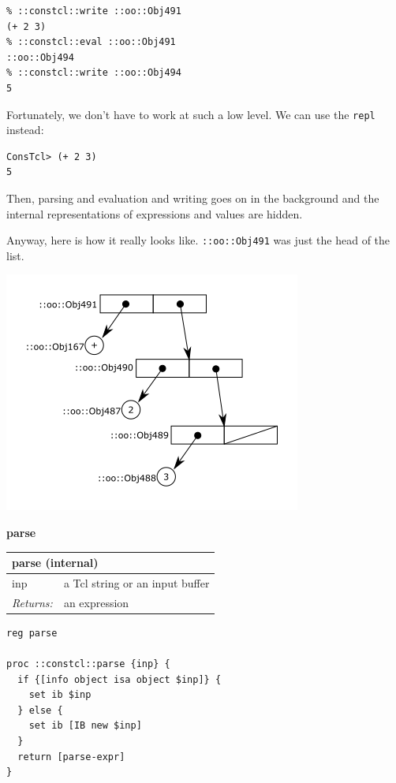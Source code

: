 \documentclass[twoside,9pt]{report}
\begin{document}
\noindent\makebox[\linewidth]{\rule{\linewidth}{0.4pt}}
\begin{lstlisting}
% ::constcl::write ::oo::Obj491
(+ 2 3)
% ::constcl::eval ::oo::Obj491
::oo::Obj494
% ::constcl::write ::oo::Obj494
5
\end{lstlisting}
\noindent\makebox[\linewidth]{\rule{\linewidth}{0.4pt}}

Fortunately, we don't have to work at such a low level. We can use the \texttt{repl} instead:

\noindent\makebox[\linewidth]{\rule{\linewidth}{0.4pt}}
\begin{lstlisting}
ConsTcl> (+ 2 3)
5
\end{lstlisting}
\noindent\makebox[\linewidth]{\rule{\linewidth}{0.4pt}}

Then, parsing and evaluation and writing goes on in the background and the internal representations of expressions and values are hidden.


Anyway, here is how it really looks like. \texttt{::oo::Obj491} was just the head of the list.


\includegraphics{images/intreplist.png}


\textbf{parse}

\begin{tabular}{ |l l| }
\hline
\multicolumn{2}{|l|}{parse (internal)} \\
\hline
inp & a Tcl string or an input buffer \\
\textit{Returns:} & an expression \\
\hline
\end{tabular}

\noindent\makebox[\linewidth]{\rule{\linewidth}{0.4pt}}
\begin{lstlisting}
reg parse
 
proc ::constcl::parse {inp} {
  if {[info object isa object $inp]} {
    set ib $inp
  } else {
    set ib [IB new $inp]
  }
  return [parse-expr]
}
\end{lstlisting}
\noindent\makebox[\linewidth]{\rule{\linewidth}{0.4pt}}
\end{document}
